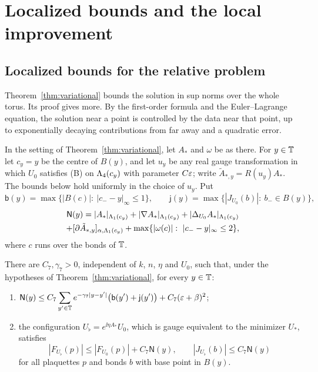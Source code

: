\section{Localized bounds and the local improvement}\label{sec:improvement}

\subsection{Localized bounds for the relative problem}\label{ss:29.1}

Theorem~\ref{thm:variational} bounds the solution in sup norms over the whole torus. Its proof gives more. By the first-order formula and the Euler--Lagrange equation, the solution near a point is controlled by the data near that point, up to exponentially decaying contributions from far away and a quadratic error.

In the setting of Theorem~\ref{thm:variational}, let $A_*$ and $\omega$ be as there. For $y\in\mathbb T$ let $c_y=y$ be the centre of $B(y)$, and let $u_y$ be any real gauge transformation in which $U_0$ satisfies (B) on $\Lambda_4(c_y)$ with parameter $C\varepsilon$; write $\tilde A_{*,y}=R(u_y)A_*$. The bounds below hold uniformly in the choice of $u_y$. Put
\[
\mathsf b(y)=\max\{|B(c)|:\ |c_--y|_\infty\le1\},\qquad \mathsf j(y)=\max\{|J_{U_0}(b)|:\ b_-\in B(y)\},
\]
\begin{multline*}
\mathsf N(y)=|A_*|_{\Lam_1(c_y)}+|\nabla A_*|_{\Lam_1(c_y)}+|\Lap_{U_0}A_*|_{\Lam_1(c_y)}\\
+\Hol{\partial\tilde A_{*,y}}{\Lam_1(c_y)}+\max\{|\omega(c)|:\ |c_--y|_\infty\le2\},
\end{multline*}
where $c$ runs over the bonds of $\mathbb T$.

\begin{proposition}\label{prop:localized}
There are $C_7,\gamma_7>0$, independent of $k$, $n$, $\eta$ and $U_0$, such that, under the hypotheses of Theorem~\ref{thm:variational}, for every $y\in\mathbb T$:
\begin{enumerate}[label=(\alph*)]
\item $\displaystyle\mathsf N(y)\le C_7\sum_{y'\in\mathbb T}e^{-\gamma_7|y-y'|}\big(\mathsf b(y')+\mathsf j(y')\big)+C_7(\varepsilon+\beta)^2$;
\item the configuration $U_\flat=e^{\ii\eta A_*}U_0$, which is gauge equivalent to the minimizer $U_*$, satisfies
\[
|F_{U_\flat}(p)|\le|F_{U_0}(p)|+C_7\mathsf N(y),\qquad|J_{U_\flat}(b)|\le C_7\mathsf N(y)
\]
for all plaquettes $p$ and bonds $b$ with base point in $B(y)$.
\end{enumerate}
\end{proposition}

